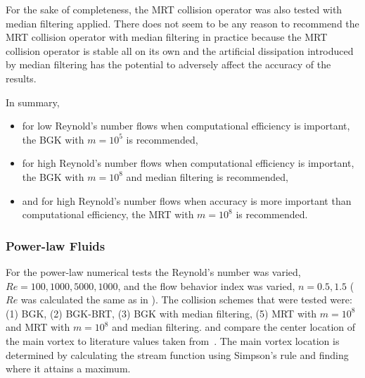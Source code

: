 \documentclass[pdftex,ms]{pittetd}
\begin{document}
For the sake of completeness, the MRT collision operator was also tested with median filtering applied.
There does not seem to be any reason to recommend the MRT collision operator with median filtering in practice because the MRT collision operator is stable all on its own and the artificial dissipation introduced by median filtering has the potential to adversely affect the accuracy of the results.

In summary, 
\begin{itemize}
    \item for low Reynold's number flows when computational efficiency is important, the BGK with $m = 10^5$ is recommended,
    \item for high Reynold's number flows when computational efficiency is important, the BGK with $m = 10^8$ and median filtering is recommended,
    \item and for high Reynold's number flows when accuracy is more important than computational efficiency, the MRT with $m = 10^8$ is recommended.
\end{itemize} 

\subsubsection{Power-law Fluids}

For the power-law numerical tests the Reynold's number was varied, $Re = 100, 1000, 5000, 1000$, and the flow behavior index was varied, $n = 0.5, 1.5$ ($Re$ was calculated the same as in ).
The collision schemes that were tested were: (1) BGK, (2) BGK-BRT, (3) BGK with median filtering, (5) MRT with $m = 10^8$ and MRT with $m = 10^8$ and median filtering.
 and  compare the center location of the main vortex to literature values taken from~\citet{li2014simulation}.
The main vortex location is determined by calculating the stream function using Simpson's rule and finding where it attains a maximum.
\end{document}
